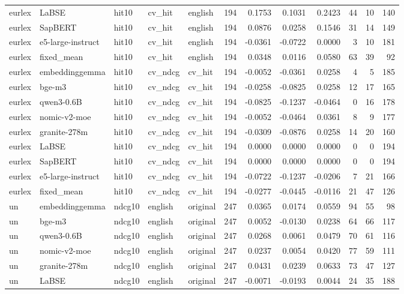 \begin{tabular}{lllllrrrrrrr}
eurlex & LaBSE & hit10 & cv\_hit & english & 194 & 0.1753 & 0.1031 & 0.2423 & 44 & 10 & 140 \\
eurlex & SapBERT & hit10 & cv\_hit & english & 194 & 0.0876 & 0.0258 & 0.1546 & 31 & 14 & 149 \\
eurlex & e5-large-instruct & hit10 & cv\_hit & english & 194 & -0.0361 & -0.0722 & 0.0000 & 3 & 10 & 181 \\
eurlex & fixed\_mean & hit10 & cv\_hit & english & 194 & 0.0348 & 0.0116 & 0.0580 & 63 & 39 & 92 \\
eurlex & embeddinggemma & hit10 & cv\_ndcg & cv\_hit & 194 & -0.0052 & -0.0361 & 0.0258 & 4 & 5 & 185 \\
eurlex & bge-m3 & hit10 & cv\_ndcg & cv\_hit & 194 & -0.0258 & -0.0825 & 0.0258 & 12 & 17 & 165 \\
eurlex & qwen3-0.6B & hit10 & cv\_ndcg & cv\_hit & 194 & -0.0825 & -0.1237 & -0.0464 & 0 & 16 & 178 \\
eurlex & nomic-v2-moe & hit10 & cv\_ndcg & cv\_hit & 194 & -0.0052 & -0.0464 & 0.0361 & 8 & 9 & 177 \\
eurlex & granite-278m & hit10 & cv\_ndcg & cv\_hit & 194 & -0.0309 & -0.0876 & 0.0258 & 14 & 20 & 160 \\
eurlex & LaBSE & hit10 & cv\_ndcg & cv\_hit & 194 & 0.0000 & 0.0000 & 0.0000 & 0 & 0 & 194 \\
eurlex & SapBERT & hit10 & cv\_ndcg & cv\_hit & 194 & 0.0000 & 0.0000 & 0.0000 & 0 & 0 & 194 \\
eurlex & e5-large-instruct & hit10 & cv\_ndcg & cv\_hit & 194 & -0.0722 & -0.1237 & -0.0206 & 7 & 21 & 166 \\
eurlex & fixed\_mean & hit10 & cv\_ndcg & cv\_hit & 194 & -0.0277 & -0.0445 & -0.0116 & 21 & 47 & 126 \\
un & embeddinggemma & ndcg10 & english & original & 247 & 0.0365 & 0.0174 & 0.0559 & 94 & 55 & 98 \\
un & bge-m3 & ndcg10 & english & original & 247 & 0.0052 & -0.0130 & 0.0238 & 64 & 66 & 117 \\
un & qwen3-0.6B & ndcg10 & english & original & 247 & 0.0268 & 0.0061 & 0.0479 & 70 & 61 & 116 \\
un & nomic-v2-moe & ndcg10 & english & original & 247 & 0.0237 & 0.0054 & 0.0420 & 77 & 59 & 111 \\
un & granite-278m & ndcg10 & english & original & 247 & 0.0431 & 0.0239 & 0.0633 & 73 & 47 & 127 \\
un & LaBSE & ndcg10 & english & original & 247 & -0.0071 & -0.0193 & 0.0044 & 24 & 35 & 188 \\

\end{tabular}
